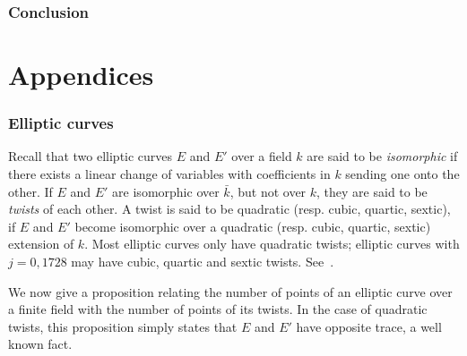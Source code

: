 \documentclass[12pt]{article}
\theoremstyle{plain}
\theoremstyle{definition}
\begin{document}

\section{Conclusion}


\appendix
\part*{Appendices}


\section{Elliptic curves}
\label{app:elliptic-curves}

Recall that two elliptic curves $E$ and $E'$ over a field $k$ are said
to be \emph{isomorphic} if there exists a linear change of variables
with coefficients in $k$ sending one onto the other. If $E$ and $E'$
are isomorphic over $\bar{k}$, but not over $k$, they are said to be
\emph{twists} of each other. A twist is said to be quadratic
(resp. cubic, quartic, sextic), if $E$ and $E'$ become isomorphic over
a quadratic (resp. cubic, quartic, sextic) extension of $k$. Most
elliptic curves only have quadratic twists; elliptic curves with
$j=0,1728$ may have cubic, quartic and sextic twists. See~\cite{Sil}.

We now give a proposition relating the number of points of an elliptic
curve over a finite field with the number of points of its twists.  In
the case of quadratic twists, this proposition simply states that $E$
and $E'$ have opposite trace, a well known fact.
\end{document}
